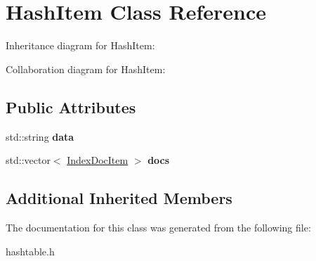 \hypertarget{classHashItem}{}\section{Hash\+Item Class Reference}
\label{classHashItem}


Inheritance diagram for Hash\+Item\+:


Collaboration diagram for Hash\+Item\+:
\subsection*{Public Attributes}
\begin{DoxyCompactItemize}
\item 
std\+::string {\bfseries data}\hypertarget{classHashItem_a570ae46a427a36adaa29f62981352ef7}{}\label{classHashItem_a570ae46a427a36adaa29f62981352ef7}

\item 
std\+::vector$<$ \hyperlink{classIndexDocItem}{Index\+Doc\+Item} $>$ {\bfseries docs}\hypertarget{classHashItem_a0d272f489413fdc1886b2c6ed17203d0}{}\label{classHashItem_a0d272f489413fdc1886b2c6ed17203d0}

\end{DoxyCompactItemize}
\subsection*{Additional Inherited Members}


The documentation for this class was generated from the following file\+:\begin{DoxyCompactItemize}
\item 
hashtable.\+h\end{DoxyCompactItemize}
